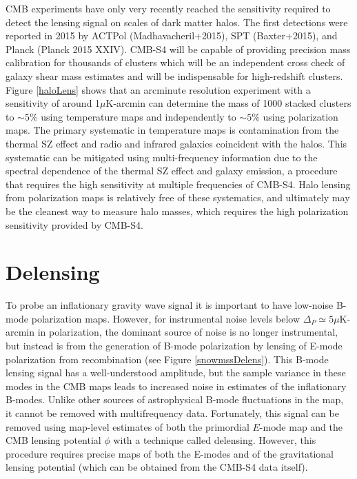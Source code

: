 CMB experiments have only very recently reached the sensitivity required to detect the lensing signal on scales of dark matter halos.  The first detections were reported in 2015 by ACTPol (Madhavacheril+2015), SPT (Baxter+2015), and Planck (Planck 2015 XXIV).  CMB-S4 will be capable of providing precision mass calibration for thousands of clusters which will be an independent cross check of galaxy shear mass estimates and will be indispensable for high-redshift clusters. Figure \ref{haloLens} shows that an arcminute resolution experiment with a sensitivity of around 1$\mu$K-arcmin can determine the mass of 1000 stacked clusters to $\sim 5\%$ using temperature maps and independently to $\sim 5\%$ using polarization maps.
The primary systematic in temperature maps is contamination from the thermal SZ effect and radio and infrared galaxies coincident with the halos. This systematic can be mitigated using multi-frequency information due to the spectral dependence of the thermal SZ effect and galaxy emission, a procedure that
requires the high sensitivity at multiple frequencies of CMB-S4.  
Halo lensing from polarization maps is relatively free of these systematics, and ultimately may be the cleanest way to measure halo masses, which 
requires the high polarization sensitivity provided by CMB-S4. 




\section{Delensing}\label{delens}

To probe an inflationary gravity wave signal it is important to have low-noise B-mode polarization maps. However, for instrumental noise levels below $\Delta_P \simeq 5 \mu$K-arcmin in polarization, the dominant source of noise is no longer instrumental, but instead is from the generation of B-mode polarization
by lensing of E-mode polarization from recombination (see Figure \ref{snowmssDelens}).  This B-mode lensing signal has a well-understood amplitude, but the 
sample variance in these modes in the CMB maps leads to 
increased noise in estimates of the inflationary B-modes. Unlike other sources of astrophysical B-mode fluctuations in the map, it cannot be removed with multifrequency data.  Fortunately, this signal can be removed using map-level 
estimates of both the primordial $E$-mode map and the CMB lensing potential $\phi$ with a technique called delensing. However, this procedure requires
precise maps of both the E-modes and of the gravitational lensing potential
(which can be obtained from the CMB-S4 data itself).

